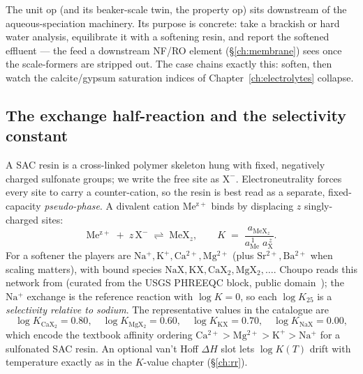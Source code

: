 \documentclass[11pt,a4paper]{article}
\begin{document}
The  unit op (and its beaker-scale twin, the
 property op) sits downstream of the aqueous-speciation
machinery.  Its purpose is concrete: take a brackish or hard water
analysis, equilibrate it with a softening resin, and report the softened
effluent --- the feed a downstream NF/RO element (\S\ref{ch:membrane})
sees once the scale-formers are stripped out.  The case
 chains exactly this: soften, then
watch the calcite/gypsum saturation indices of
Chapter~\ref{ch:electrolytes} collapse.

\subsection{The exchange half-reaction and the selectivity constant}

A SAC resin is a cross-linked polymer skeleton hung with fixed,
negatively charged sulfonate groups; we write the free site as
$\mathrm{X^-}$.  Electroneutrality forces every site to carry a
counter-cation, so the resin is best read as a separate, fixed-capacity
\emph{pseudo-phase}.  A divalent cation $\mathrm{Me^{z+}}$ binds by
displacing $z$ singly-charged sites:
\begin{equation}
   \mathrm{Me^{z+}} \;+\; z\,\mathrm{X^-}
   \;\rightleftharpoons\; \mathrm{Me X}_z,
   \qquad
   K \;=\; \frac{a_{\mathrm{Me X}_z}}{a_{\mathrm{Me}}^{\,1}\;a_{\mathrm{X}}^{\,z}}.
   \label{eq:ix-massaction}
\end{equation}
For a softener the players are
$\mathrm{Na^+}, \mathrm{K^+}, \mathrm{Ca^{2+}}, \mathrm{Mg^{2+}}$
(plus $\mathrm{Sr^{2+}}, \mathrm{Ba^{2+}}$ when scaling matters), with
bound species $\mathrm{NaX}, \mathrm{KX}, \mathrm{CaX_2}, \mathrm{MgX_2},
\ldots$.  Choupo reads this network from  (curated
from the USGS PHREEQC  block, public
domain~\cite{Parkhurst2013}); the $\mathrm{Na^+}$ exchange is the
reference reaction with $\log K = 0$, so each $\log K_{25}$ is a
\emph{selectivity relative to sodium}.  The representative values in the
catalogue are
\begin{equation}
   \log K_{\mathrm{Ca X_2}} = 0.80,\quad
   \log K_{\mathrm{Mg X_2}} = 0.60,\quad
   \log K_{\mathrm{K X}}   = 0.70,\quad
   \log K_{\mathrm{Na X}}  = 0.00,
   \label{eq:ix-logk}
\end{equation}
which encode the textbook affinity ordering
$\mathrm{Ca^{2+}} > \mathrm{Mg^{2+}} > \mathrm{K^+} > \mathrm{Na^+}$ for
a sulfonated SAC resin.  An optional van't Hoff $\Delta H$ slot lets
$\log K(T)$ drift with temperature exactly as in the $K$-value chapter
(\S\ref{ch:rr}).
\end{document}
